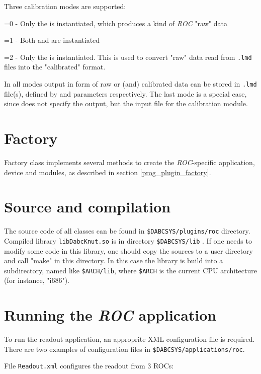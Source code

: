 Three calibration modes are supported:
\bbul
\item {}=0 - Only the  is instantiated, which produces a kind of {\em ROC} "raw" data 
\item {}=1 - Both  and  are instantiated   
\item {}=2 - Only the  is instantiated. 
This is used to convert "raw" data read from {\tt .lmd} files into the "calibrated" format.
\ebul

In all modes output in form of raw or (and) calibrated data can be stored in 
{\tt .lmd} file(s), defined by  and  parameters respectively. The last mode is a special case,
since  does not specify the output, but the input file for the 
calibration module.


\section{Factory}

Factory class  implements several methods to create the 
{\em ROC}-specific application, device and modules, as described in section 
\ref{prog_plugin_factory}.    


\section{Source and compilation}

The source code of all classes can be found in 
{\tt \$DABCSYS/plugins/roc} directory. 
Compiled library {\tt libDabcKnut.so} is in directory
{\tt \$DABCSYS/lib} .
If one needs to modify some code in this library, one should copy the sources to 
a user directory and call "make" in this directory. In this case the library 
is build into
a subdirectory, named like {\tt \$ARCH/lib}, where {\tt \$ARCH} 
is the current CPU architecture (for instance, "i686").

 
\section{Running the {\em ROC} application}

To run the readout application, an approprite XML configuration file 
is required. There are two examples of configuration files in {\tt \$DABCSYS/applications/roc}.

File {\tt Readout.xml} configures the readout from 3 ROCs: 


